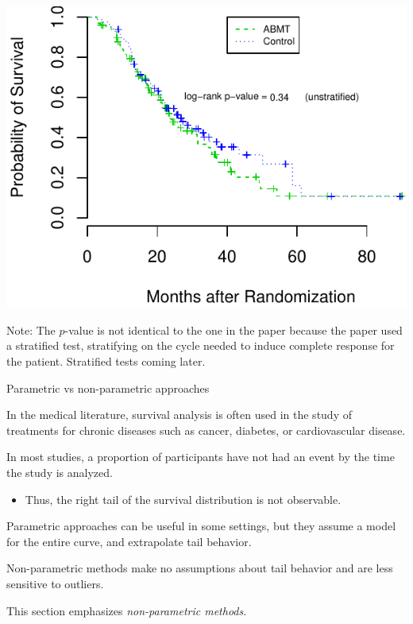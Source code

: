 \documentclass[ignorenonframetext,]{beamer}
\providecommand{\tightlist}{%
  \setlength{\itemsep}{0pt}\setlength{\parskip}{0pt}}
\begin{document}
\begin{frame}

\scriptsize

\includegraphics{unit_03_significance_testing_files/figure-beamer/unnamed-chunk-4-1.pdf}

\footnotesize

Note: The \(p\)-value is not identical to the one in the paper because
the paper used a stratified test, stratifying on the cycle needed to
induce complete response for the patient. Stratified tests coming later.

\end{frame}

\begin{frame}{%
\protect\hypertarget{parametric-vs-non-parametric-approaches}{%
Parametric vs non-parametric approaches}}

In the medical literature, survival analysis is often used in the study
of treatments for chronic diseases such as cancer, diabetes, or
cardiovascular disease.

In most studies, a proportion of participants have not had an event by
the time the study is analyzed.

\begin{itemize}
\tightlist
\item
  Thus, the right tail of the survival distribution is not observable.
\end{itemize}

Parametric approaches can be useful in some settings, but they assume a
model for the entire curve, and extrapolate tail behavior.

Non-parametric methods make no assumptions about tail behavior and are
less sensitive to outliers.

This section emphasizes \emph{non-parametric methods}.

\end{frame}
\end{document}
